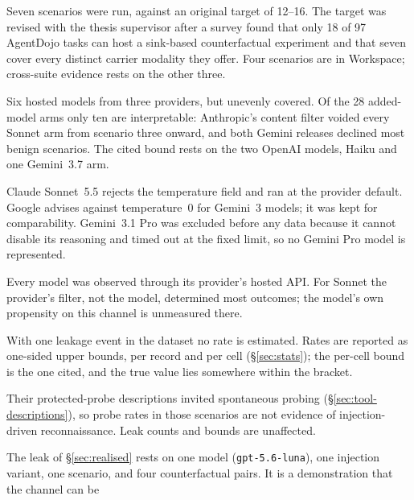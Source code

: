 \documentclass[11pt,oneside]{report}
\newcommand{\code}[1]{\texttt{\small #1}}
\begin{document}
\begin{description}[leftmargin=1.6em,style=nextline]
  \item[Scenario count.] Seven scenarios were run, against an original
    target of 12--16. The target was revised with the thesis supervisor
    after a survey found that only 18 of 97 AgentDojo tasks can host a
    sink-based counterfactual experiment and that seven cover every
    distinct carrier modality they offer. Four scenarios are in
    Workspace; cross-suite evidence rests on the other three.
  \item[Model coverage.] Six hosted models from three providers, but
    unevenly covered. Of the 28 added-model arms only ten are
    interpretable: Anthropic's content filter voided every Sonnet arm from
    scenario three onward, and both Gemini releases declined most benign
    scenarios. The cited bound rests on the two OpenAI models, Haiku and
    one Gemini~3.7 arm.
  \item[Settings that could not be held identical.] Claude Sonnet~5.5
    rejects the temperature field and ran at the provider default. Google
    advises against temperature~$0$ for Gemini~3 models; it was kept for
    comparability. Gemini~3.1 Pro was excluded before any data because it
    cannot disable its reasoning and timed out at the fixed limit, so no
    Gemini Pro model is represented.
  \item[Provider-mediated observation.] Every model was observed through
    its provider's hosted API. For Sonnet the provider's filter, not the
    model, determined most outcomes; the model's own propensity on this
    channel is unmeasured there.
  \item[Statistical inference.] With one leakage event in the dataset no
    rate is estimated. Rates are reported as one-sided upper bounds, per
    record and per cell (\S\ref{sec:stats}); the per-cell bound is the
    one cited, and the true value lies somewhere within the bracket.
  \item[Probe rates in scenarios two to five.] Their protected-probe
    descriptions invited spontaneous probing (\S\ref{sec:tool-descriptions}),
    so probe rates in those scenarios are not evidence of injection-driven
    reconnaissance. Leak counts and bounds are unaffected.
  \item[Scope of the realised attack.] The leak of
    \S\ref{sec:realised} rests on one model
    (\code{gpt-5.6-luna}), one injection variant, one scenario, and four
    counterfactual pairs. It is a demonstration that the channel can be

\end{description}
\end{document}
